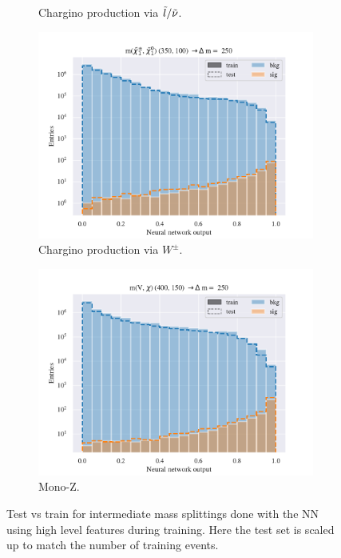 \begin{figure}[H]
\begin{subfigure}[t!]{0.49\textwidth}
        \caption{Chargino production via $\Tilde{l}/\Tilde{\nu}$.}
        \label{fig:}
    \end{subfigure}    
    \begin{subfigure}[t!]{0.49\textwidth}
        \includegraphics[width = \textwidth]{Figures/WW/NN/High_level/Inter/scaled_train_test_395320.pdf}
        \caption{Chargino production via $W^\pm$.}
        \label{fig:}
    \end{subfigure}
    \begin{subfigure}[t!]{0.49\textwidth}
        \includegraphics[width = \textwidth]{Figures/Mono_Z/ML/NN/High_level/Inter/scaled_train_test_310613.pdf}
        \caption{Mono-Z.}
        \label{fig:}
    \end{subfigure}
    \caption{Test vs train for intermediate mass splittings done with the NN using high level features during training. Here the test set is scaled up to match the number of training events.}
    \label{fig:}
\end{figure}






